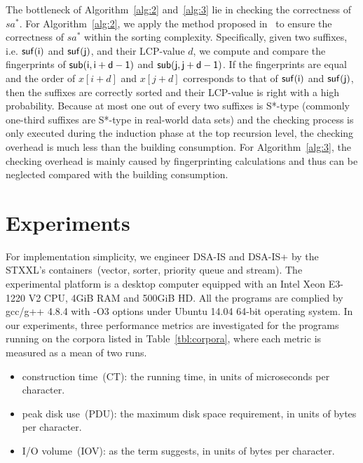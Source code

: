 \documentclass[10pt,journal,compsoc]{IEEEtran}
\begin{document}
The bottleneck of Algorithm~\ref{alg:2} and~\ref{alg:3} lie in checking the correctness of $sa^*$. For Algorithm~\ref{alg:2}, we apply the method proposed in~\cite{wu2017} to ensure the correctness of $sa^*$ within the sorting complexity. Specifically, given two suffixes, i.e. $\sf suf(i)$ and $\sf suf(j)$, and their LCP-value $d$, we compute and compare the fingerprints of $\sf sub(i, i + d - 1)$ and $\sf sub(j, j + d - 1)$. If the fingerprints are equal and the order of $x[i + d]$ and $x[j + d]$ corresponds to that of $\sf suf(i)$ and $\sf suf(j)$, then the suffixes are correctly sorted and their LCP-value is right with a high probability. Because at most one out of every two suffixes is S*-type (commonly one-third suffixes are S*-type in real-world data sets) and the checking process is only executed during the induction phase at the top recursion level, the checking overhead is much less than the building consumption. For Algorithm~\ref{alg:3}, the checking overhead is mainly caused by fingerprinting calculations and thus can be neglected compared with the building consumption.

\section{Experiments} \label{sec:experiments}

For implementation simplicity, we engineer DSA-IS and DSA-IS+ by the STXXL's containers~(vector, sorter, priority queue and stream). The experimental platform is a desktop computer equipped with an Intel Xeon E3-1220 V2 CPU, 4GiB RAM and 500GiB HD. All the programs are complied by gcc/g++ 4.8.4 with -O3 options under Ubuntu 14.04 64-bit operating system. In our experiments, three performance metrics are investigated for the programs running on the corpora listed in Table~\ref{tbl:corpora}, where each metric is measured as a mean of two runs.

\begin{itemize}
	\item construction time~(CT): the running time, in units of microseconds per character.
	\item peak disk use~(PDU): the maximum disk space requirement, in units of bytes per character.
	\item I/O volume~(IOV): as the term suggests, in units of bytes per character.
\end{itemize}
\end{document}
